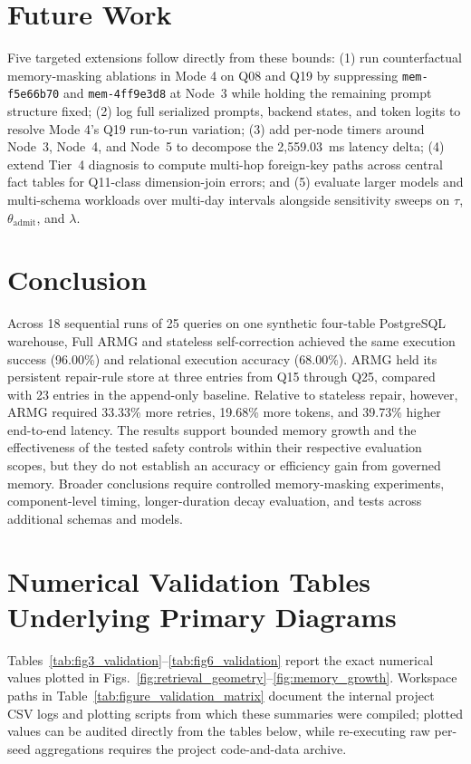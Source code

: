\section{Future Work}
Five targeted extensions follow directly from these bounds: (1) run counterfactual memory-masking ablations in Mode 4 on Q08 and Q19 by suppressing \texttt{mem-f5e66b70} and \texttt{mem-4ff9e3d8} at Node~3 while holding the remaining prompt structure fixed; (2) log full serialized prompts, backend states, and token logits to resolve Mode 4's Q19 run-to-run variation; (3) add per-node timers around Node~3, Node~4, and Node~5 to decompose the 2,559.03~ms latency delta; (4) extend Tier~4 diagnosis to compute multi-hop foreign-key paths across central fact tables for Q11-class dimension-join errors; and (5) evaluate larger models and multi-schema workloads over multi-day intervals alongside sensitivity sweeps on $\tau$, $\theta_{\text{admit}}$, and $\lambda$.

\section{Conclusion}
Across 18 sequential runs of 25 queries on one synthetic four-table PostgreSQL warehouse, Full ARMG and stateless self-correction achieved the same execution success (96.00\%) and relational execution accuracy (68.00\%). ARMG held its persistent repair-rule store at three entries from Q15 through Q25, compared with 23 entries in the append-only baseline. Relative to stateless repair, however, ARMG required 33.33\% more retries, 19.68\% more tokens, and 39.73\% higher end-to-end latency. The results support bounded memory growth and the effectiveness of the tested safety controls within their respective evaluation scopes, but they do not establish an accuracy or efficiency gain from governed memory. Broader conclusions require controlled memory-masking experiments, component-level timing, longer-duration decay evaluation, and tests across additional schemas and models.

\appendix
\section{Numerical Validation Tables Underlying Primary Diagrams}

Tables~\ref{tab:fig3_validation}--\ref{tab:fig6_validation} report the exact numerical values plotted in Figs.~\ref{fig:retrieval_geometry}--\ref{fig:memory_growth}. Workspace paths in Table~\ref{tab:figure_validation_matrix} document the internal project CSV logs and plotting scripts from which these summaries were compiled; plotted values can be audited directly from the tables below, while re-executing raw per-seed aggregations requires the project code-and-data archive.

